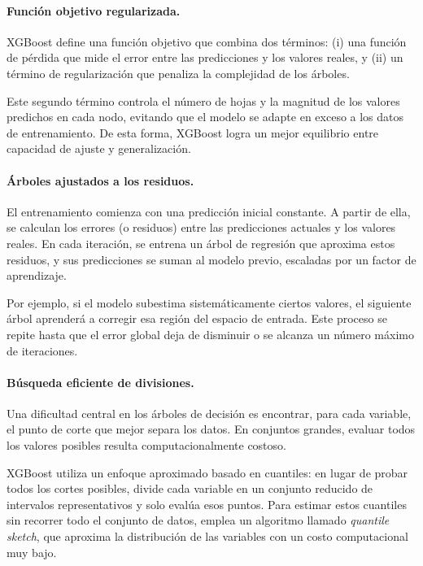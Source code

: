 \paragraph{Función objetivo regularizada.}
XGBoost define una función objetivo que combina dos términos:  
(i) una función de pérdida que mide el error entre las predicciones y los
valores reales, y  
(ii) un término de regularización que penaliza la complejidad de los árboles.
  
Este segundo término controla el número de hojas y la magnitud de los valores
predichos en cada nodo, evitando que el modelo se adapte en exceso a los datos
de entrenamiento. De esta forma, XGBoost logra un mejor equilibrio entre
capacidad de ajuste y generalización.

\paragraph{Árboles ajustados a los residuos.}
El entrenamiento comienza con una predicción inicial constante. A partir de
ella, se calculan los errores (o residuos) entre las predicciones actuales y
los valores reales. En cada iteración, se entrena un árbol de regresión que
aproxima estos residuos, y sus predicciones se suman al modelo previo,
escaladas por un factor de aprendizaje.

Por ejemplo, si el modelo subestima sistemáticamente ciertos valores, el
siguiente árbol aprenderá a corregir esa región del espacio de entrada. Este
proceso se repite hasta que el error global deja de disminuir o se alcanza un
número máximo de iteraciones.

\paragraph{Búsqueda eficiente de divisiones.}
Una dificultad central en los árboles de decisión es encontrar, para cada
variable, el punto de corte que mejor separa los datos. En conjuntos grandes,
evaluar todos los valores posibles resulta computacionalmente costoso.

XGBoost utiliza un enfoque aproximado basado en cuantiles: en lugar de probar
todos los cortes posibles, divide cada variable en un conjunto reducido de
intervalos representativos y solo evalúa esos puntos. Para estimar estos
cuantiles sin recorrer todo el conjunto de datos, emplea un algoritmo llamado
\textit{quantile sketch}, que aproxima la distribución de las variables con un
costo computacional muy bajo.

